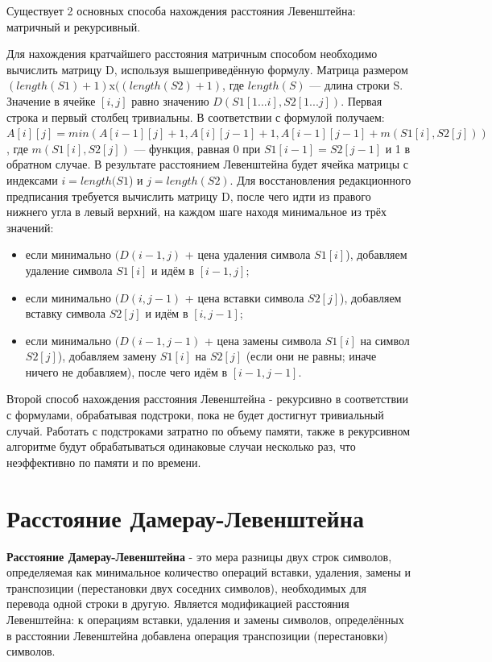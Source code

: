 \documentclass[a4paper,12pt]{report}
\begin{document}
Существует 2 основных способа нахождения расстояния Левенштейна:\\матричный и рекурсивный.


Для нахождения кратчайшего расстояния матричным способом необходимо вычислить матрицу D, используя вышеприведённую формулу. Матрица размером $(length(S1)+ 1)$x$((length(S2) + 1)$, где $length(S)$ — длина строки S. Значение в ячейке $[i, j]$ равно значению $D(S1[1...i], S2[1...j])$. Первая строка и первый столбец тривиальны. В соответствии с формулой получаем: $A[i][j] = min (A[i-1][j] + 1, A[i][j-1] + 1, A[i-1][j-1] + m(S1[i], S2[j]))$, где $m(S1[i], S2[j])$ — функция, равная 0 при $S1[i - 1] = S2[j - 1]$ и 1 в обратном случае. В результате расстоянием Левенштейна будет ячейка матрицы с индексами $i = length(S1$) и $j = length(S2)$.
Для восстановления редакционного предписания требуется вычислить матрицу D, после чего идти из правого нижнего угла в левый верхний, на каждом шаге находя минимальное из трёх значений:
    \begin{itemize}
    \item если минимально $(D(i-1, j)$ + цена удаления символа $S1[i]$), добавляем удаление символа $S1[i]$ и идём в $[i-1, j]$;
    \item если минимально $(D(i, j-1)$ + цена вставки символа $S2[j]$), добавляем вставку     символа $S2[j]$ и идём в $[i, j-1]$;
    \item если минимально $(D(i-1, j-1)$ + цена замены символа $S1[i]$ на символ $S2[j]$),     добавляем замену $S1[i]$ на $S2[j]$ (если они не равны; иначе ничего не добавляем), после чего идём в $[i-1, j-1]$.
	\end{itemize}

Второй способ нахождения расстояния Левенштейна - рекурсивно в соответствии с формулами, обрабатывая подстроки, пока не будет достигнут тривиальный случай. Работать с подстроками затратно по объему памяти, также в рекурсивном алгоритме будут обрабатываться одинаковые случаи несколько раз, что неэффективно по памяти и по времени.

\section{Расстояние Дамерау-Левенштейна}
\hspace{0.6cm}\textbf{Расстояние Дамерау-Левенштейна} - это мера разницы двух строк символов, определяемая как минимальное количество операций вставки, удаления, замены и транспозиции (перестановки двух соседних символов), необходимых для перевода одной строки в другую. Является модификацией расстояния Левенштейна: к операциям вставки, удаления и замены символов, определённых в расстоянии Левенштейна добавлена операция транспозиции (перестановки) символов.
\end{document}
